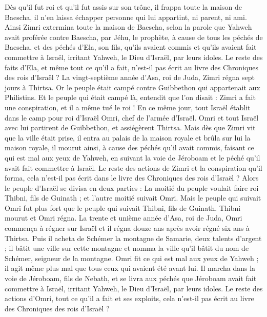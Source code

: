 \begin{multicols}{2}
Dès qu'il fut roi et qu'il fut assis sur son trône, il frappa toute la maison de Baescha, il n'en laissa échapper personne qui lui appartint, ni parent, ni ami.
Ainsi Zimri extermina toute la maison de Baescha, selon la parole que Yahweh avait proférée contre Baescha, par Jéhu, le prophète,
à cause de tous les péchés de Baescha, et des péchés d'Ela, son fils, qu'ils avaient commis et qu'ils avaient fait commettre à Israël, irritant Yahweh, le Dieu d'Israël, par leurs idoles.
Le reste des faits d'Ela, et même tout ce qu'il a fait, n'est-il pas écrit au livre des Chroniques des rois d'Israël ?
La vingt-septième année d'Asa, roi de Juda, Zimri régna sept jours à Thirtsa. Or le peuple était campé contre Guibbethon qui appartenait aux Philistins.
Et le peuple qui était campé là, entendit que l'on disait : Zimri a fait une conspiration, et il a même tué le roi ! En ce même jour, tout Israël établit dans le camp pour roi d'Israël Omri, chef de l'armée d'Israël.
Omri et tout Israël avec lui partirent de Guibbethon, et assiégèrent Thirtsa.
Mais dès que Zimri vit que la ville était prise, il entra au palais de la maison royale et brûla sur lui la maison royale, il mourut ainsi,
à cause des péchés qu'il avait commis, faisant ce qui est mal aux yeux de Yahweh, en suivant la voie de Jéroboam et le péché qu'il avait fait commettre à Israël.
Le reste des actions de Zimri et la conspiration qu'il forma, cela n'est-il pas écrit dans le livre des Chroniques des rois d'Israël ?
Alors le peuple d'Israël se divisa en deux parties : La moitié du peuple voulait faire roi Thibni, fils de Guinath ; et l'autre moitié suivait Omri.
Mais le peuple qui suivait Omri fut plus fort que le peuple qui suivait Thibni, fils de Guinath. Thibni mourut et Omri régna.
La trente et unième année d'Asa, roi de Juda, Omri commença à régner sur Israël et il régna douze ans après avoir régné six ans à Thirtsa.
Puis il acheta de Schémer la montagne de Samarie, deux talents d'argent ; il bâtit une ville sur cette montagne et nomma la ville qu'il bâtit du nom de Schémer, seigneur de la montagne.
Omri fit ce qui est mal aux yeux de Yahweh ; il agit même plus mal que tous ceux qui avaient été avant lui.
Il marcha dans la voie de Jéroboam, fils de Nebath, et se livra aux péchés que Jéroboam avait fait commettre à Israël, irritant Yahweh, le Dieu d'Israël, par leurs idoles.
Le reste des actions d'Omri, tout ce qu'il a fait et ses exploits, cela n'est-il pas écrit au livre des Chroniques des rois d'Israël ?

\end{multicols}
